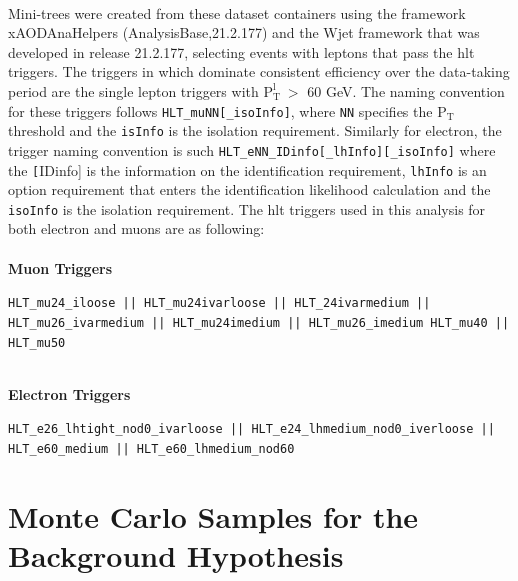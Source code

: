 \\
Mini-trees were created from these dataset containers using the framework xAODAnaHelpers (AnalysisBase,21.2.177) and the Wjet framework that was developed in release 21.2.177, selecting 
events with leptons that pass the \gls{hlt} triggers. The triggers in which dominate consistent efficiency over the data-taking period are the single lepton triggers with $\textrm{P}_{\textrm{T}}^{\textrm{l}} \ >$  60 GeV.
The naming convention for these triggers follows \texttt{HLT\_muNN[\_isoInfo]}, where \texttt{NN} specifies the $\textrm{P}_{\textrm{T}}$ threshold and the \texttt{isInfo} is the isolation requirement.
Similarly for electron, the trigger naming convention is such \texttt{HLT\_eNN\_IDinfo[\_lhInfo][\_isoInfo]} where the \texttt[IDinfo] is the information on the identification requirement,
\texttt{lhInfo} is an option requirement that enters the identification likelihood calculation and the \texttt{isoInfo} is the isolation requirement. 
The \gls{hlt} triggers used in this analysis for both electron and muons are as following:
\\
\\
\textbf{Muon Triggers}
\\
\begin{small}
\texttt{HLT\_mu24\_iloose     ||  HLT\_mu24ivarloose    ||  HLT\_24ivarmedium   ||} \\
\texttt{HLT\_mu26\_ivarmedium ||  HLT\_mu24imedium      ||  HLT\_mu26\_imedium HLT\_mu40  || HLT\_mu50}\\
\\
\end{small}
\textbf{Electron Triggers}
\\
\begin{small}
\texttt{HLT\_e26\_lhtight\_nod0\_ivarloose    ||  HLT\_e24\_lhmedium\_nod0\_iverloose  ||}\\
\texttt{HLT\_e60\_medium                      ||  HLT\_e60\_lhmedium\_nod60}\\
\end{small}

\newpage

\vspace*{0.5in}

\section{Monte Carlo Samples for the Background Hypothesis}
\label{appendix:mc-ad}
\setcounter{equation}{0}

